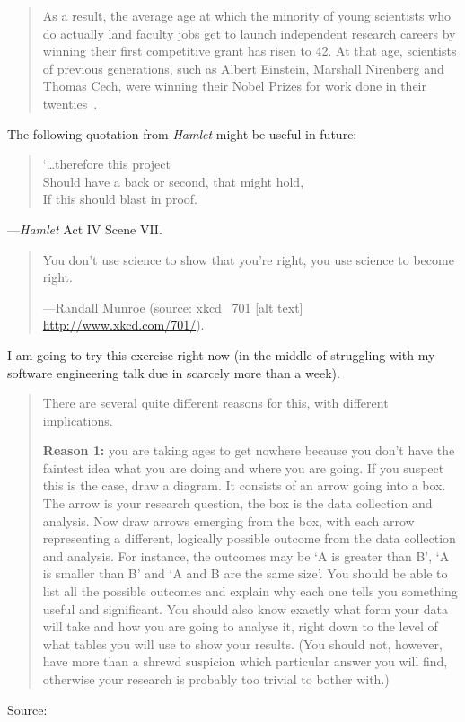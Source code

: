 \documentclass[a4paper]{article}
\begin{document}
\medskip
\begin{quote}
	As a result, the average age at which the minority of young
	scientists who do actually land faculty jobs get to launch
	independent research careers by winning their first competitive
	grant has risen to 42. At that age, scientists of previous
	generations, such as Albert Einstein, Marshall Nirenberg and
	Thomas Cech, were winning their Nobel Prizes for work done in
	their twenties~\citep{Benderly2010}.
\end{quote}

\medskip
The following quotation from {\it Hamlet} might be useful in future:
\begin{quote}
	`\ldots therefore this project \\
	Should have a back or second, that might hold, \\
	If this should blast in proof.
\end{quote}
---{\it Hamlet} Act IV Scene VII.

\medskip
\begin{quote}
	You don't use science to show that you're right, you use science to
	become right.

	---Randall Munroe (source: xkcd \textnumero~701 [alt text]
	\url{http://www.xkcd.com/701/}).
\end{quote}

\medskip
I am going to try this exercise right now (in the middle of struggling
with my software engineering talk due in scarcely more than a week).
\begin{quote}

	\noindent\smallskip There are several quite different reasons for this,
	with different implications.

	{\bf Reason 1:} you are taking ages to get nowhere because you don't
	have the faintest idea what you are doing and where you are going.  If
	you suspect this is the case, draw a diagram.  It consists of an arrow
	going into a box.  The arrow is your research question, the box is the
	data collection and analysis.  Now draw arrows emerging from the box,
	with each arrow representing a different, logically possible outcome
	from the data collection and analysis.  For instance, the outcomes may
	be `A is greater than B', `A is smaller than B' and `A and B are the
	same size'.  You should be able to list all the possible outcomes and
	explain why each one tells you something useful and significant.  You
	should also know exactly what form your data will take and how you are
	going to analyse it, right down to the level of what tables you will
	use to show your results.  (You should not, however, have more than a
	shrewd suspicion which particular answer you will find, otherwise your
	research is probably too trivial to bother with.)

\end{quote}
Source: \citet[p.~29]{Rugg2004}
\end{document}
